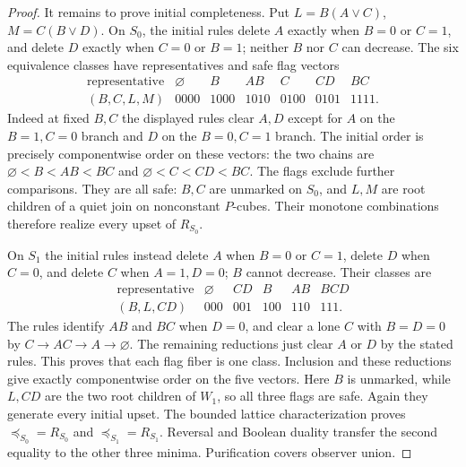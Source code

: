 \begin{proof}
It remains to prove initial completeness. Put
$L=B(A\vee C)$, $M=C(B\vee D)$. On $S_0$, the initial rules delete
$A$ exactly when $B=0$ or $C=1$, and delete $D$ exactly when $C=0$
or $B=1$; neither $B$ nor $C$ can decrease. The six equivalence classes
have representatives and safe flag vectors
\[
 \begin{array}{c|cccccc}
 \text{representative}&\varnothing&B&AB&C&CD&BC\\\hline
 (B,C,L,M)&0000&1000&1010&0100&0101&1111.
 \end{array}
\]
Indeed at fixed $B,C$ the displayed rules clear $A,D$ except for $A$
on the $B=1,C=0$ branch and $D$ on the $B=0,C=1$ branch.
The initial order is precisely componentwise order on these vectors:
the two chains are $\varnothing<B<AB<BC$ and
$\varnothing<C<CD<BC$. The flags exclude further comparisons.
They are all safe: $B,C$ are unmarked on $S_0$, and $L,M$ are root
children of a quiet join on nonconstant $P$-cubes. Their monotone
combinations therefore realize every upset of $R_{S_0}$.

On $S_1$ the initial rules instead delete $A$ when $B=0$ or $C=1$,
delete $D$ when $C=0$, and delete $C$ when $A=1,D=0$; $B$ cannot
decrease. Their classes are
\[
 \begin{array}{c|ccccc}
 \text{representative}&\varnothing&CD&B&AB&BCD\\\hline
 (B,L,CD)&000&001&100&110&111.
 \end{array}
\]
The rules identify $AB$ and $BC$ when $D=0$, and clear a lone $C$
with $B=D=0$ by $C\to AC\to A\to\varnothing$.
The remaining reductions just clear $A$ or $D$ by the stated rules.
This proves that each flag fiber is one class. Inclusion and these
reductions give exactly componentwise order on the five vectors.
Here $B$ is unmarked, while $L,CD$ are the two root children of $W_1$,
so all three flags are safe. Again they generate every initial upset.
The bounded lattice characterization proves
$\preceq_{S_0}=R_{S_0}$ and $\preceq_{S_1}=R_{S_1}$.
Reversal and Boolean duality transfer the second equality to the
other three minima. Purification covers observer union.
\end{proof}

